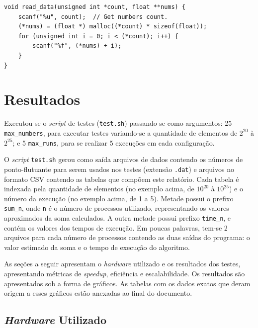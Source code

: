 \documentclass[12pt,a4paper]{article}
\begin{document}
\begin{lstlisting}[style=c, numbers=none]
void read_data(unsigned int *count, float **nums) {
	scanf("%u", count);  // Get numbers count.
	(*nums) = (float *) malloc((*count) * sizeof(float));
	for (unsigned int i = 0; i < (*count); i++) {
		scanf("%f", (*nums) + i); 
	}
}
\end{lstlisting}

\section{Resultados}
\label{sec:resultados}
Executou-se o \textit{script} de testes (\texttt{test.sh}) passando-se como
argumentos: 25 \texttt{max\_numbers}, para executar testes variando-se a
quantidade de elementos de $2^{20}$ à $2^{25}$; e 5 \texttt{max\_runs}, para se
realizar 5 execuções em cada configuração.

O \textit{script} \texttt{test.sh} gerou como saída arquivos de dados contendo
os números de ponto-flutuante para serem usados nos testes (extensão
\texttt{.dat}) e arquivos no formato CSV contendo as tabelas que compõem este
relatório. Cada tabela é indexada pela quantidade de elementos (no exemplo
acima, de $10^{20}$ à $10^{25}$) e o número da execução (no exemplo acima, de 1
a 5). Metade possui o prefixo \texttt{sum\_{n}}, onde \texttt{n} é o número de
processos utilizado, representando os valores aproximados da soma calculados. A
outra metade possui prefixo \texttt{time\_{n}}, e contém os valores dos tempos
de execução.  Em poucas palavras, tem-se 2 arquivos para cada número de
processos contendo as duas saídas do programa: o valor estimado da soma e o
tempo de execução do algoritmo.

As seções a seguir apresentam o \textit{hardware} utilizado e os resultados dos
testes, apresentando métricas de \textit{speedup}, eficiência e escalabilidade.
Os resultados são apresentados sob a forma de gráficos. As tabelas com os dados
exatos que deram origem a esses gráficos estão anexadas ao final do documento.


\subsection{\textit{Hardware} Utilizado}
\label{sec:hardware}
\end{document}
